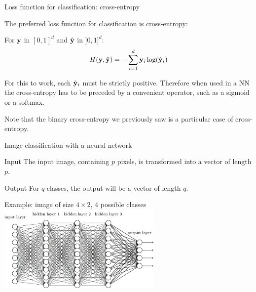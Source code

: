 \documentclass[xcolor=pdftex,dvipsnames,table,mathserif]{beamer}
\begin{document}
\begin{frame}{Loss function for classification: cross-entropy}

  The preferred loss function for classification is cross-entropy:

  \begin{block}{}
    For $\mathbf{y}$ in $[0, 1]^d$ and $\hat{\mathbf{y}}$ in $]0, 1]^d$:
        \[
        H(\mathbf{y}, \hat{\mathbf{y}}) = - \sum_{i=1}^d \mathbf{y}_i \log(\hat{\mathbf{y}}_i)
        \]
  \end{block}

  \pause

  \begin{alertblock}{}
    For this to work, each $\hat{\mathbf{y}}_i$ must be strictly positive. Therefore when used in a NN the cross-entropy has to be preceded by a convenient operator, such as a sigmoid or a softmax.
  \end{alertblock}

  \pause

  Note that the binary cross-entropy we previously saw is a particular case of cross-entropy.


\end{frame}

\begin{frame}{Image classification with a neural network}

  \begin{block}{Input}
    The input image, containing $p$ pixels, is transformed into a vector of length $p$.
  \end{block}

  \begin{block}{Output}
    For $q$ classes, the output will be a vector of length $q$.
  \end{block}

\pause

  \begin{block}{Example: image of size $4 \times 2$, $4$ possible classes}
    \centering
      \includegraphics[width=0.6\textwidth]{network}
  \end{block}

\end{frame}
\end{document}
